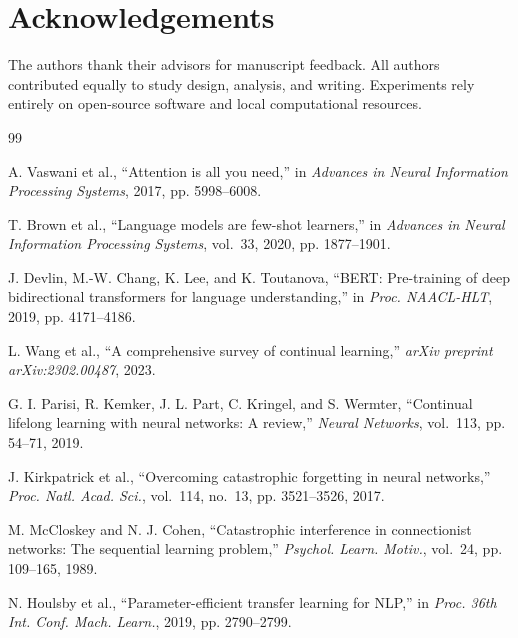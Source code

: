 \documentclass[11pt,a4paper]{article}
\begin{document}
\section*{Acknowledgements}

The authors thank their advisors for manuscript feedback.  All authors
contributed equally to study design, analysis, and writing.
Experiments rely entirely on open-source software and local
computational resources.

\begin{thebibliography}{99}

A. Vaswani et al., ``Attention is all you need,'' in \emph{Advances
in Neural Information Processing Systems}, 2017, pp. 5998--6008.

T. Brown et al., ``Language models are few-shot learners,'' in
\emph{Advances in Neural Information Processing Systems}, vol.~33,
2020, pp. 1877--1901.

J. Devlin, M.-W. Chang, K. Lee, and K. Toutanova, ``BERT:
Pre-training of deep bidirectional transformers for language
understanding,'' in \emph{Proc. NAACL-HLT}, 2019, pp. 4171--4186.

L. Wang et al., ``A comprehensive survey of continual learning,''
\emph{arXiv preprint arXiv:2302.00487}, 2023.

G. I. Parisi, R. Kemker, J. L. Part, C. Kringel, and S. Wermter,
``Continual lifelong learning with neural networks: A review,''
\emph{Neural Networks}, vol.~113, pp. 54--71, 2019.

J. Kirkpatrick et al., ``Overcoming catastrophic forgetting in neural
networks,'' \emph{Proc. Natl. Acad. Sci.}, vol.~114, no.~13,
pp. 3521--3526, 2017.

M. McCloskey and N. J. Cohen, ``Catastrophic interference in
connectionist networks: The sequential learning problem,'' \emph{Psychol.
Learn. Motiv.}, vol.~24, pp. 109--165, 1989.

N. Houlsby et al., ``Parameter-efficient transfer learning for NLP,''
in \emph{Proc. 36th Int. Conf. Mach. Learn.}, 2019, pp. 2790--2799.


\end{thebibliography}
\end{document}
